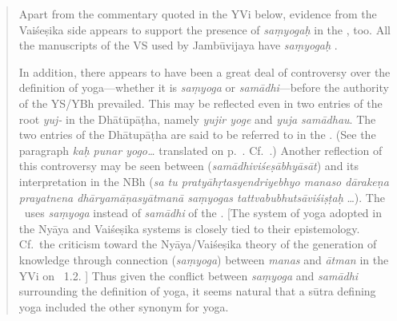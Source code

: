 \begin{quotation}
{		Apart from the commentary quoted in the YVi below, evidence from the Vaiśeṣika side appears to support the presence of \emph{saṃyogaḥ\/} in the \sutra, too.  All the manuscripts of the VS used by Jambūvijaya have \emph{saṃyogaḥ} \citep[42]{vs}.%

		In addition, there appears to have been a great deal of controversy over the definition of yoga---whether it is \emph{saṃyoga\/} or \emph{samādhi}---before the authority of the YS/YBh prevailed.  This may be reflected even in two entries of the root \emph{yuj-\/} in the Dhātūpāṭha, namely \emph{yujir yoge} and \emph{yuja samādhau}.  The two entries of the Dhātupāṭha are said to be referred to in the \YBh. (See the paragraph \emph{kaḥ punar yogo\ldots}  translated on p.~\pageref{KHPNR1}.  Cf.\ \citet{bronkhorst:history}.)  Another reflection of this controversy may be seen between  (\emph{samādhiviśeṣābhyāsāt}) and its interpretation in the NBh (\emph{sa tu pratyāhṛtasyendriyebhyo manaso dārakeṇa prayatnena dhāryamāṇasyātmanā saṃyogas tattvabubhutsāviśiṣṭaḥ} \ldots).  The \NBh\ uses \emph{saṃyoga\/} instead of \emph{samādhi\/} of the \sutra.  [The system of yoga adopted in the Nyāya and Vaiśeṣika systems is closely tied to their epistemology.  Cf.\ the criticism toward the Nyāya/Vaiśeṣika theory of the generation of knowledge through connection (\emph{saṃyoga}) between \emph{manas\/} and \emph{ātman} in the YVi on \PYS\ 1.2.%
		]  Thus given the conflict between \emph{saṃyoga\/} and \emph{samādhi\/} surrounding the definition of yoga, it seems natural that a sūtra defining yoga included the other synonym for yoga.%

}
\end{quotation}
